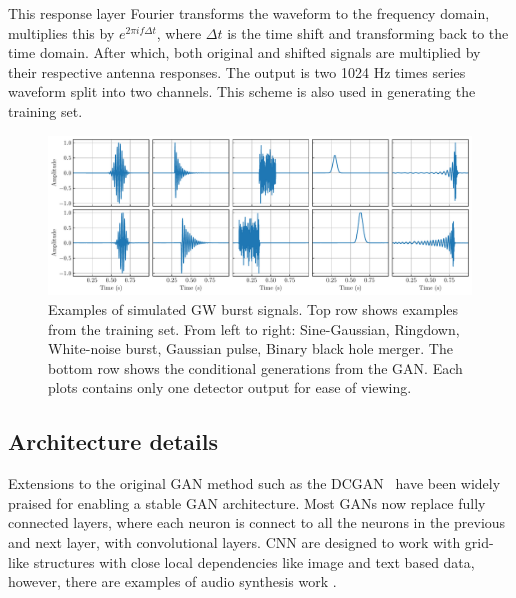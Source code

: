 \documentclass[12pt]{iopart}
\begin{document}
This response layer Fourier transforms the waveform
to the frequency domain, multiplies this by $e^{2 \pi i f \Delta t}$, where $\Delta
t$ is the time shift and transforming back
to the time domain. After which, both original and shifted signals are
multiplied by their respective  antenna responses. The output is two 1024 Hz times series waveform split into two channels.
This scheme is also used in generating the
training set.

\begin{figure}
    \centering
    \includegraphics[width=\textwidth]{figures/train_gen.pdf}
    \caption{Examples of simulated \ac{GW} burst signals. Top row shows
examples from the training set. From left to right: Sine-Gaussian, Ringdown,
White-noise burst, Gaussian pulse, Binary black hole merger. The bottom row
shows the conditional generations from the GAN. Each plots contains only one detector output for ease of viewing.}
\label{fig:train} \end{figure}

\subsection{Architecture details}

%
Extensions to the original \ac{GAN} method such as the
\ac{DCGAN}~\cite{Radford2015} have been widely praised for
enabling a stable \ac{GAN} architecture. Most GANs now replace fully connected layers, where each neuron is connect to all the neurons in the previous and next layer, with convolutional layers. \ac{CNN} are designed to work with grid-like structures with close local dependencies like image and text based data, however, there are examples of audio synthesis work \cite{DBLP:journals/corr/abs-1809-11096}.
\end{document}

